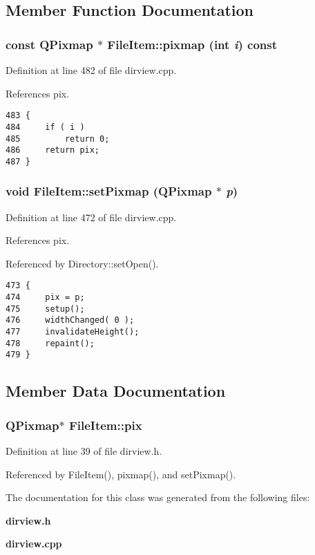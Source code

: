 \subsection{Member Function Documentation}
\subsubsection{\setlength{\rightskip}{0pt plus 5cm}const QPixmap $\ast$ File\-Item::pixmap (int {\em i}) const}\label{classFileItem_FileItema1}




Definition at line 482 of file dirview.cpp.

References pix.



\footnotesize\begin{verbatim}483 {
484     if ( i )
485         return 0;
486     return pix;
487 }
\end{verbatim}\normalsize 
{}
\subsubsection{\setlength{\rightskip}{0pt plus 5cm}void File\-Item::set\-Pixmap (QPixmap $\ast$ {\em p})}\label{classFileItem_FileItema2}




Definition at line 472 of file dirview.cpp.

References pix.

Referenced by Directory::set\-Open().



\footnotesize\begin{verbatim}473 {
474     pix = p;
475     setup();
476     widthChanged( 0 );
477     invalidateHeight();
478     repaint();
479 }
\end{verbatim}\normalsize 


\subsection{Member Data Documentation}
\subsubsection{\setlength{\rightskip}{0pt plus 5cm}QPixmap$\ast$ {\bf File\-Item::pix}\hspace{0.3cm}{\tt  [private]}}\label{classFileItem_FileItemr0}




Definition at line 39 of file dirview.h.

Referenced by File\-Item(), pixmap(), and set\-Pixmap().

The documentation for this class was generated from the following files:\begin{CompactItemize}
\item 
{\bf dirview.h}\item 
{\bf dirview.cpp}\end{CompactItemize}
